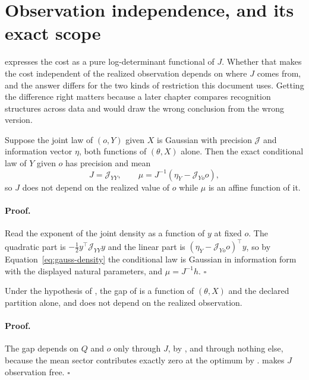 \section{Observation independence, and its exact scope}
\label{sec:restrict-observation}

 expresses the cost as a pure log-determinant functional of $J$. Whether that makes the cost independent of the realized observation depends on where $J$ comes from, and the answer differs for the two kinds of restriction this document uses. Getting the difference right matters because a later chapter compares recognition structures across data and would draw the wrong conclusion from the wrong version.

Suppose the joint law of $(o,Y)$ given $X$ is Gaussian with precision $\mathcal J$ and information vector $\eta$, both functions of $(\theta,X)$ alone. Then the exact conditional law of $Y$ given $o$ has precision and mean
\begin{equation}
J=\mathcal J_{YY},
\qquad
\mu=J^{-1}\left(\eta_Y-\mathcal J_{Yo}o\right),
\label{eq:restrict-conditional-from-joint}
\end{equation}
so $J$ does not depend on the realized value of $o$ while $\mu$ is an affine function of it. 

\paragraph{Proof.}
Read the exponent of the joint density as a function of $y$ at fixed $o$. The quadratic part is $-\tfrac12y^\top\mathcal J_{YY}y$ and the linear part is $(\eta_Y-\mathcal J_{Yo}o)^\top y$, so by Equation~\eqref{eq:gauss-density} the conditional law is Gaussian in information form with the displayed natural parameters, and $\mu=J^{-1}h$. $\square$

Under the hypothesis of , the gap of  is a function of $(\theta,X)$ and the declared partition alone, and does not depend on the realized observation. 

\paragraph{Proof.}
The gap depends on $Q$ and $o$ only through $J$, by , and through nothing else, because the mean sector contributes exactly zero at the optimum by .  makes $J$ observation free. $\square$

